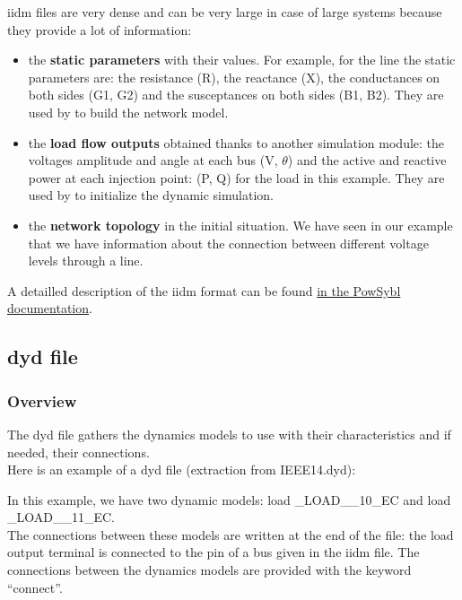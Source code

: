 \documentclass[a4paper, 12pt]{report}
\begin{document}
iidm files are very dense and can be very large in case of large systems because they provide a lot of information:
\begin{itemize}
\item the \textbf{static parameters} with their values. For example, for the line the static parameters are: the resistance (R), the reactance (X), the conductances on both sides (G1, G2) and the susceptances on both sides (B1, B2).  They are used by \Dynawo to build the network model.
\item the \textbf{load flow outputs} obtained thanks to another simulation module: the voltages amplitude and angle at each bus (V, $\theta$) and the active and reactive power at each injection point: (P, Q) for the load in this example. They are used by \Dynawo to initialize the dynamic simulation.
\item the \textbf{network topology} in the initial situation. We have seen in our example that we have information about the connection between different voltage levels through a line.
\end{itemize}

A detailled description of the iidm format can be found \href{https://www.powsybl.org/pages/documentation/grid/model/)}{in the PowSybl documentation}.


\subsection{dyd file}
\label{DynawoInputFiles_inputs_dyd}
\subsubsection{Overview}

The dyd file gathers the dynamics models to use with their characteristics and if needed, their connections. \\

Here is an example of a dyd file (extraction from IEEE14.dyd):


In this example, we have two dynamic models: load \_LOAD\_\_10\_EC and load \_LOAD\_\_11\_EC. \\

The connections between these models are written at the end of the file: the load output terminal is connected to the pin of a bus given in the iidm file. The connections between the dynamics models are provided with the keyword ``connect''. \\
\end{document}
